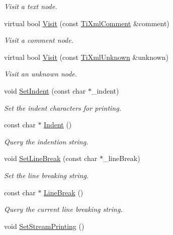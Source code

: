 \begin{DoxyCompactItemize}
\begin{DoxyCompactList}\small\item\em Visit a text node. \end{DoxyCompactList}\item 
virtual bool \hyperlink{class_ti_xml_printer_a9870423f5603630e6142f6bdb66dfb57}{Visit} (const \hyperlink{class_ti_xml_comment}{TiXmlComment} \&comment)
\begin{DoxyCompactList}\small\item\em Visit a comment node. \end{DoxyCompactList}\item 
virtual bool \hyperlink{class_ti_xml_printer_a08591a15c9a07afa83c24e08b03d6358}{Visit} (const \hyperlink{class_ti_xml_unknown}{TiXmlUnknown} \&unknown)
\begin{DoxyCompactList}\small\item\em Visit an unknown node. \end{DoxyCompactList}\item 
void \hyperlink{class_ti_xml_printer_a213377a4070c7e625bae59716b089e5e}{SetIndent} (const char $\ast$\_\-indent)
\begin{DoxyCompactList}\small\item\em Set the indent characters for printing. \end{DoxyCompactList}\item 
const char $\ast$ \hyperlink{class_ti_xml_printer_abb33ec7d4bad6aaeb57f4304394b133d}{Indent} ()
\begin{DoxyCompactList}\small\item\em Query the indention string. \end{DoxyCompactList}\item 
void \hyperlink{class_ti_xml_printer_a4be1e37e69e3858c59635aa947174fe6}{SetLineBreak} (const char $\ast$\_\-lineBreak)
\begin{DoxyCompactList}\small\item\em Set the line breaking string. \end{DoxyCompactList}\item 
const char $\ast$ \hyperlink{class_ti_xml_printer_a11f1b4804a460b175ec244eb5724d96d}{LineBreak} ()
\begin{DoxyCompactList}\small\item\em Query the current line breaking string. \end{DoxyCompactList}\item 
void \hyperlink{class_ti_xml_printer_ab23a90629e374cb1cadca090468bbd19}{SetStreamPrinting} ()

\end{DoxyCompactItemize}
